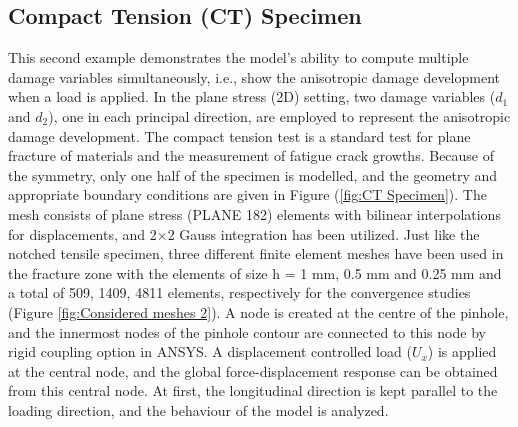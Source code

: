 \documentclass[12pt,a4paper,twoside,openright]{report}
\begin{document}
\subsection{Compact Tension (CT) Specimen}\label{CT specimen}
\indent\indent\indent   This second example demonstrates the model's ability to compute multiple damage variables simultaneously, i.e., show the anisotropic damage development when a load is applied. In the plane stress (2D) setting, two damage variables ($d_{1}$ and $d_{2}$), one in each principal direction, are employed to represent the anisotropic damage development. The compact tension test is a standard test for plane fracture of materials and the measurement of fatigue crack growths. Because of the symmetry, only one half of the specimen is modelled, and the geometry and appropriate boundary conditions \citep{peerlings1999enhanced} are given in Figure (\ref{fig:CT Specimen}). The mesh consists of plane stress (PLANE 182) elements with bilinear interpolations for displacements, and 2$\times$2 Gauss integration has been utilized. Just like the notched tensile specimen, three different finite element meshes have been used in the fracture zone with the elements of size h = 1 mm, 0.5 mm and 0.25 mm and a total of 509, 1409, 4811 elements, respectively for the convergence studies (Figure \ref{fig:Considered meshes 2}).  A node is created at the centre of the pinhole, and the innermost nodes of the pinhole contour are connected to this node by rigid coupling option in ANSYS. A displacement controlled load ($U_{x}$) is applied at the central node, and the global force-displacement response can be obtained from this central node.  At first, the longitudinal direction is kept parallel to the loading direction, and the behaviour of the model is analyzed.
\end{document}
